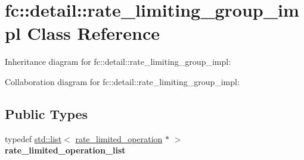\hypertarget{classfc_1_1detail_1_1rate__limiting__group__impl}{}\section{fc\+:\+:detail\+:\+:rate\+\_\+limiting\+\_\+group\+\_\+impl Class Reference}
\label{classfc_1_1detail_1_1rate__limiting__group__impl}


Inheritance diagram for fc\+:\+:detail\+:\+:rate\+\_\+limiting\+\_\+group\+\_\+impl\+:


Collaboration diagram for fc\+:\+:detail\+:\+:rate\+\_\+limiting\+\_\+group\+\_\+impl\+:
\subsection*{Public Types}
\begin{DoxyCompactItemize}
\item 
\mbox{\label{classfc_1_1detail_1_1rate__limiting__group__impl_a07f20311261056eb4c1f137a08d5c899}} 
typedef \mbox{\hyperlink{classstd_1_1list}{std\+::list}}$<$ \mbox{\hyperlink{classfc_1_1detail_1_1rate__limited__operation}{rate\+\_\+limited\+\_\+operation}} $\ast$ $>$ {\bfseries rate\+\_\+limited\+\_\+operation\+\_\+list}
\end{DoxyCompactItemize}
